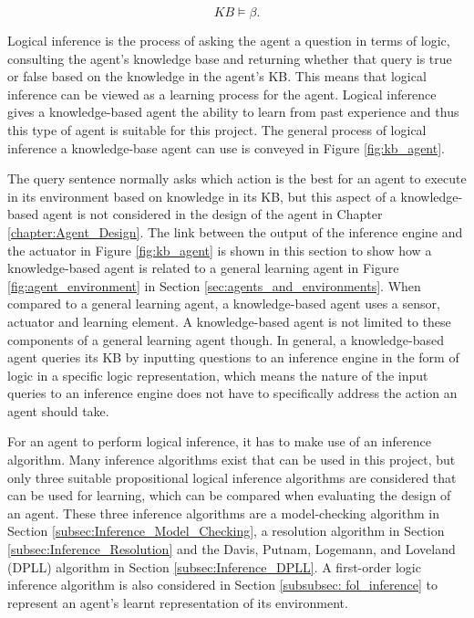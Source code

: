\begin{equation}
	KB \models \beta.
	\label{eq:entailment_KB_query}
\end{equation}

Logical inference is the process of asking the agent a question in terms of logic, consulting the agent's knowledge base and returning whether that query is true or false based on the knowledge in the agent's KB. This means that logical inference can be viewed as a learning process for the agent. Logical inference gives a knowledge-based agent the ability to learn from past experience and thus this type of agent is suitable for this project.  The general process of logical inference a knowledge-base agent can use is conveyed in Figure \ref{fig:kb_agent}.

The query sentence normally asks which action is the best for an agent to execute in its environment based on knowledge in its KB, but this aspect of a knowledge-based agent is not considered in the design of the agent in Chapter \ref{chapter:Agent_Design}. The link between the output of the inference engine and the actuator in Figure \ref{fig:kb_agent} is shown in this section to show how a knowledge-based agent is related to a general learning agent in Figure  \ref{fig:agent_environment} in Section \ref{sec:agents_and_environments}. When compared to a general learning agent, a knowledge-based agent uses a sensor, actuator and learning element. A knowledge-based agent is not limited to these components of a general learning agent though. In general, a knowledge-based agent queries its KB by inputting questions to an inference engine in the form of logic in a specific logic representation, which means the nature of the input queries to an inference engine does not have to specifically address the action an agent should take. 

For an agent to perform logical inference, it has to make use of an inference algorithm. Many inference algorithms exist that can be used in this project, but only three suitable propositional logical inference algorithms are considered that can be used for learning, which can be compared when evaluating the design of an agent. These three inference algorithms are a model-checking algorithm in Section \ref{subsec:Inference_Model_Checking}, a resolution algorithm in Section \ref{subsec:Inference_Resolution} and the Davis, Putnam, Logemann, and Loveland (DPLL) algorithm in Section \ref{subsec:Inference_DPLL}. A first-order logic inference  algorithm is also considered in Section \ref{subsubsec: fol_inference} to represent an agent's learnt representation of its environment.

